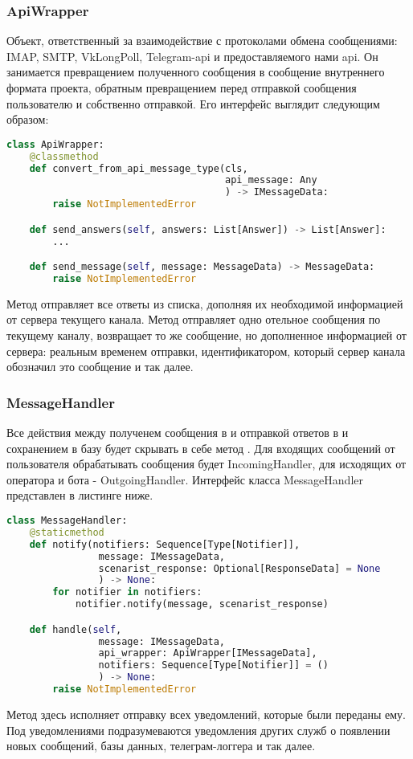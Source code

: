     \subsubsection*{ApiWrapper}
    Объект, ответственный за взаимодействие с протоколами обмена сообщениями: IMAP, SMTP, VkLongPoll,
    Telegram-api и предоставляемого нами api.
    Он занимается превращением полученного сообщения в сообщение внутреннего формата проекта,
    обратным превращением перед отправкой сообщения пользователю и собственно отправкой.
    Его интерфейс выглядит следующим образом:
\begin{lstlisting}[language=Python]
class ApiWrapper:
    @classmethod
    def convert_from_api_message_type(cls,
                                      api_message: Any
                                      ) -> IMessageData:
        raise NotImplementedError

    def send_answers(self, answers: List[Answer]) -> List[Answer]:
        ...

    def send_message(self, message: MessageData) -> MessageData:
        raise NotImplementedError
\end{lstlisting}
    Метод  отправляет все ответы из списка, дополняя их
    необходимой информацией от сервера текущего канала. 
    Метод  отправляет одно отельное сообщения по текущему каналу,
    возвращает то же сообщение, но дополненное информацией от сервера: реальным временем
    отправки, идентификатором, который сервер канала обозначил это сообщение и так далее.

    \subsubsection*{MessageHandler}
    Все действия между полученем сообщения в  и отправкой ответов
    в  и сохранением в базу будет скрывать в себе метод
    . Для входящих сообщений от пользователя обрабатывать
    сообщения будет IncomingHandler, для исходящих от оператора и бота - OutgoingHandler.
    Интерфейс класса MessageHandler представлен в листинге ниже.
\begin{lstlisting}[language=Python]
class MessageHandler:
    @staticmethod
    def notify(notifiers: Sequence[Type[Notifier]],
                message: IMessageData,
                scenarist_response: Optional[ResponseData] = None
                ) -> None:
        for notifier in notifiers:
            notifier.notify(message, scenarist_response)

    def handle(self,
                message: IMessageData,
                api_wrapper: ApiWrapper[IMessageData],
                notifiers: Sequence[Type[Notifier]] = ()
                ) -> None:
        raise NotImplementedError
\end{lstlisting}
    Метод  здесь исполняет отправку всех уведомлений,
    которые были переданы ему. Под уведомлениями подразумеваются уведомления других служб
    о появлении новых сообщений, базы данных, телеграм-логгера и так далее.

